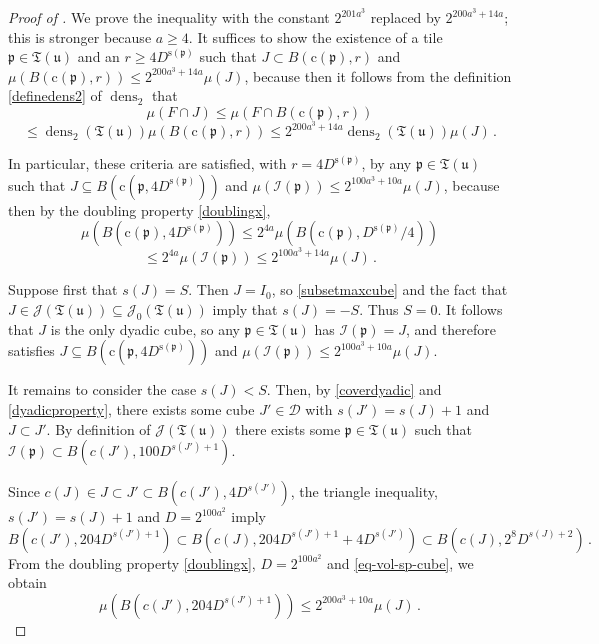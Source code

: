 \documentclass[10pt,a4paper]{article}
\theoremstyle{plain}
\theoremstyle{definition}
\numberwithin{equation}{subsection}
\DeclareMathOperator{\dens}{\operatorname{dens}}
\newcommand{\fp}{{\mathfrak p}}
\newcommand{\fu}{{\mathfrak u}}
\newcommand{\fT}{{\mathfrak T}}
\newcommand{\pc}{{\mathrm{c}}}
\newcommand{\ps}{{\mathrm{s}}}
\newcommand{\scI}{{\mathcal{I}}} %
\newcommand{\proves}[1]{}
\newcommand{\leanok}{}
\begin{document}
\begin{proof}[Proof of ]
    \proves{local-dens2-tree-bound}
    \leanok
    We prove the inequality with the constant $2^{201a^3}$ replaced by $2 ^ {200a^3 + 14a}$; this
    is stronger because $a \geq 4$. It suffices to show the existence of a tile $\fp \in \fT(\fu)$
    and an $r \geq 4 D ^ {\ps(\fp)}$ such that $J \subset B(\pc(\fp), r)$ and
    $\mu(B(\pc(\fp), r)) ≤ 2 ^ {200a^3 + 14a} \mu(J)$, because then it follows from the definition
    \eqref{definedens2} of $\dens_2$ that
    $$
        \mu(F \cap J) \le \mu(F \cap B(\pc(\fp), r))
    $$
    $$
        \le \dens_2(\fT(\fu)) \mu(B(\pc(\fp), r)) \le 2^{200a^3 + 14a} \dens_2(\fT(\fu))\mu(J)\,.
    $$

    In particular, these criteria are satisfied, with $r = 4 D ^ {\ps(\fp)}$, by any
    $\fp \in \fT(\fu)$ such that $J \subseteq B(\pc(\fp, 4 D ^ {\ps(\fp)}))$ and
    $\mu(\scI(\fp)) \le 2^{100a^3 + 10a} \mu(J)$, because then by the doubling property
    \eqref{doublingx},
    $$
        \mu(B(\pc(\fp), 4 D ^ {\ps(\fp)})) \le 2^{4a} \mu(B(\pc(\fp), D ^ {\ps(\fp)} / 4))
    $$
    $$
        \le 2^{4a} \mu(\scI(\fp)) \le 2^{100a^3 + 14a} \mu(J)\,.
    $$

    Suppose first that $s(J) = S$. Then $J = I_0$, so \eqref{subsetmaxcube} and the fact that
    $J \in \mathcal{J}(\fT(\fu)) \subseteq \mathcal{J}_0(\fT(\fu))$ imply that $s(J) = -S$. Thus
    $S = 0$. It follows that $J$ is the only dyadic cube, so any $\fp \in \fT(\fu)$ has
    $\scI(\fp) = J$, and therefore satisfies $J \subseteq B(\pc(\fp, 4 D ^ {\ps(\fp)}))$ and
    $\mu(\scI(\fp)) \le 2^{100a^3 + 10a} \mu(J)$.

    It remains to consider the case $s(J) < S$. Then, by \eqref{coverdyadic} and
    \eqref{dyadicproperty}, there exists some cube $J' \in \mathcal{D}$ with $s(J') = s(J) + 1$ and
    $J \subset J'$. By definition of $\mathcal{J}(\fT(\fu))$ there exists some $\fp \in \fT(\fu)$
    such that $\scI(\fp) \subset B(c(J'), 100 D^{s(J') + 1})$.

    Since $c(J) \in J \subset J' \subset B(c(J'), 4D^{s(J')})$, the triangle inequality,
    $s(J') = s(J) + 1$ and $D=2^{100a^2}$ imply
    $$
        B(c(J'), 204D^{s(J')+1}) \subset B(c(J), 204D^{s(J') + 1} + 4D^{s(J')})
                                 \subset B(c(J), 2^8 D^{s(J) + 2})\,.
    $$
    From the doubling property \eqref{doublingx}, $D=2^{100a^2}$ and \eqref{eq-vol-sp-cube}, we
    obtain
    \begin{equation}
        \label{measure-comparison}
        \mu(B(c(J'), 204D^{s(J') + 1})) \leq 2 ^ {200a^3 + 10a} \mu(J)\,.
    \end{equation}


\end{proof}
\end{document}
